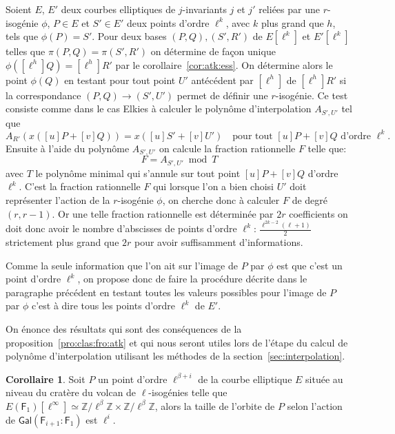 \documentclass[10pt,a4paper]{book}
\theoremstyle{plain}
\theoremstyle{definition}
\theoremstyle{definition}
\newtheorem{cor}[thm]{Corollaire}
\theoremstyle{definition}
\theoremstyle{definition}
\theoremstyle{remark}
\theoremstyle{remark}
\theoremstyle{definition}
\begin{document}
Soient $E$, $E'$ deux courbes elliptiques de $j$-invariants $j$ et $j'$ reliées
par une $r$-isogénie $\phi$, $P \in E$ et $S' \in E'$ deux points d'ordre 
$\ell^{k}$, avec $k$  plus grand que $h$, tels que $\phi(P)=S'$. Pour deux 
bases $(P,Q),(S',R')$ de $E[\ell^k]$ et $E'[\ell^k]$ telles que $\pi(P,Q)=
\pi(S',R')$ on détermine de façon unique $\phi([\ell^h]Q)=[\ell^h]R'$ par le 
corollaire~\ref{cor:atk:ess}. On détermine alors le point 
$\phi(Q)$ en testant pour tout point $U'$ antécédent par $[\ell^h]$ de 
$[\ell^h]R'$ si la correspondance $(P,Q) \rightarrow (S',U')$ permet de définir
une $r$-isogénie. Ce test consiste comme dans le cas Elkies à calculer le 
polynôme d'interpolation $A_{S',U'}$ tel que 
\[
A_{R'}(x([u]P+[v]Q))=x([u]S'+[v]U') \quad \text{pour tout $[u]P+[v]Q$ d'ordre $\ell^k$}.
\]
Ensuite à l'aide du polynôme $A_{S',U'}$ on calcule la fraction rationnelle $F$ telle que:
\[
F=A_{S',U'} \bmod T
\]
avec $T$ le polynôme minimal qui s'annule sur tout point $[u]P +[v]Q$ 
d'ordre $\ell^k$. C'est la fraction rationnelle $F$ qui lorsque l'on a bien 
choisi $U'$ doit représenter l'action de la $r$-isogénie $\phi$, on cherche 
donc à calculer $F$ de degré $(r,r-1)$. Or une telle fraction rationnelle est 
déterminée par $2r$ coefficients on doit donc avoir le nombre d'abscisses de 
points d'ordre $\ell^k$: $\frac{\ell^{2k-2}(\ell+1)}{2}$ strictement plus grand
que $2r$ pour avoir suffisamment d'informations.

Comme la seule information que l'on ait sur l'image de $P$ par $\phi$ est que 
c'est un point d'ordre $\ell^k$, on propose donc de faire la procédure décrite 
dans le paragraphe précédent en testant toutes les valeurs possibles pour 
l'image de $P$ par $\phi$ c'est à dire tous les points d'ordre $\ell^k$ de 
$E'$.

On énonce des résultats qui sont des conséquences de la 
proposition~\ref{pro:clas:fro:atk} et qui nous seront utiles lors de l'étape 
du calcul de polynôme d'interpolation utilisant les méthodes de la 
section~\ref{sec:interpolation}.

\begin{cor}
Soit $P$ un point d'ordre $\ell^{\beta+i}$ de la courbe elliptique $E$ située 
au niveau du cratère du volcan de $\ell$-isogénies telle que $E(\mathsf{F}_
{1})[\ell^{\infty}] \simeq \mathbb{Z}/ \ell^{\beta} \mathbb{Z} \times 
\mathbb{Z}/ \ell^{\beta}\mathbb{Z}$, alors la taille de l'orbite de $P$ selon 
l'action de $\mathsf{Gal}(\mathsf{F}_{i+1}:\mathsf{F}_{1})$ est 
$\ell^i$. 
\end{cor}
\end{document}
